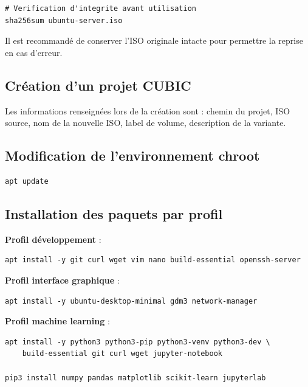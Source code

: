 \begin{lstlisting}[basicstyle=\ttfamily\footnotesize, frame=single]
# Verification d'integrite avant utilisation
sha256sum ubuntu-server.iso
\end{lstlisting}

Il est recommandé de conserver l'ISO originale intacte pour permettre la reprise en cas d'erreur.

\subsection{Création d'un projet CUBIC}

Les informations renseignées lors de la création sont : chemin du projet, ISO source, nom de la nouvelle ISO, label de volume, description de la variante.

\subsection{Modification de l'environnement chroot}

\begin{lstlisting}[basicstyle=\ttfamily\footnotesize, frame=single]
apt update
\end{lstlisting}

\subsection{Installation des paquets par profil}

\textbf{Profil développement} :
\begin{lstlisting}[basicstyle=\ttfamily\footnotesize, frame=single]
apt install -y git curl wget vim nano build-essential openssh-server
\end{lstlisting}

\textbf{Profil interface graphique} :
\begin{lstlisting}[basicstyle=\ttfamily\footnotesize, frame=single]
apt install -y ubuntu-desktop-minimal gdm3 network-manager
\end{lstlisting}

\textbf{Profil machine learning} :
\begin{lstlisting}[basicstyle=\ttfamily\footnotesize, frame=single]
apt install -y python3 python3-pip python3-venv python3-dev \
    build-essential git curl wget jupyter-notebook

pip3 install numpy pandas matplotlib scikit-learn jupyterlab
\end{lstlisting}

